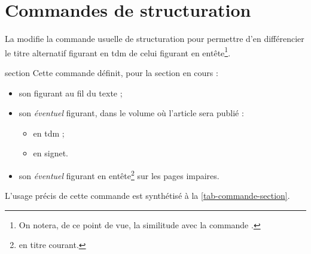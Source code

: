 \documentclass[french,nolocaltoc]{nwejmart}
\newtheorem[title=Fait,style=definition]{fact}
\begin{document}
\section{Commandes de structuration}

La \nwejmauthorcl{} modifie la commande usuelle de structuration
 pour permettre d'en différencier le titre alternatif
figurant en \gls{tdm} de celui figurant en entête\footnote{On notera, de ce
  point de vue, la similitude avec la commande \protect{}.}.

\begin{docCommand}[doc new=2017-10-23]{section}{}
  Cette commande définit, pour la section en cours :
  \begin{itemize}
  \item son  figurant au fil du texte ;
  \item son \emph{éventuel}  figurant, dans le volume où
    l'article sera publié :
    \begin{itemize}
    \item en \gls{tdm} ;
    \item en signet.
    \end{itemize}
  \item son \emph{éventuel}  figurant en
    entête\footnote{\Ie{} en titre courant.} sur les pages impaires.
  \end{itemize}
  L'usage précis de cette commande est synthétisé à la
  \vref{tab-commande-section}.
\end{docCommand}
\end{document}
